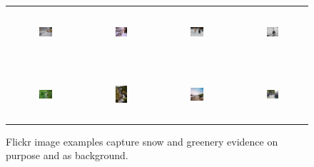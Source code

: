 \begin{figure}[th]
{\small{
\begin{center}
\begin{tabular}{@{}c@{\,\,\,}c@{\,\,\,}c@{\,\,\,}c@{\,\,\,}}
\includegraphics[width=0.19\textwidth, height=0.7in]{image/citysnow.jpg} &
\includegraphics[width=0.19\textwidth, height=0.7in]{image/citysnow2.jpg} &
\includegraphics[width=0.19\textwidth, height=0.7in]{image/dogsnow.jpg} &
\includegraphics[width=0.19\textwidth, height=0.7in]{image/humansnow.jpg} \\
\\[-6pt]
\hline
\\[-6pt]
\includegraphics[width=0.19\textwidth, height=0.7in]{image/intentiongreen.jpg} &
\includegraphics[width=0.19\textwidth, height=0.7in]{image/waterfallgreen.jpg} &
\includegraphics[width=0.19\textwidth, height=0.7in]{image/dogtree.jpg} &
\includegraphics[width=0.19\textwidth, height=0.7in]{image/humantree.jpg} \\
\end{tabular}
\end{center}
}}
\caption{Flickr image examples capture snow and greenery evidence on purpose and as background.}
\label{fig:flickrexp}
\end{figure}
